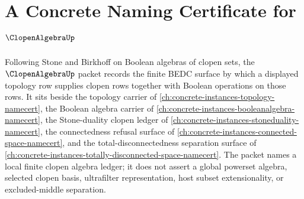 \chapter{A Concrete Naming Certificate for $\ClopenAlgebraUp$}
\label{ch:concrete-instances-clopen-algebra-namecert}

Following Stone and Birkhoff on Boolean algebras of clopen sets, the $\ClopenAlgebraUp$ packet records the finite BEDC surface by which a displayed topology row supplies clopen rows together with Boolean operations on those rows. It sits beside the topology carrier of \autoref{ch:concrete-instances-topology-namecert}, the Boolean algebra carrier of \autoref{ch:concrete-instances-booleanalgebra-namecert}, the Stone-duality clopen ledger of \autoref{ch:concrete-instances-stoneduality-namecert}, the connectedness refusal surface of \autoref{ch:concrete-instances-connected-space-namecert}, and the total-disconnectedness separation surface of \autoref{ch:concrete-instances-totally-disconnected-space-namecert}. The packet names a local finite clopen algebra ledger; it does not assert a global powerset algebra, selected clopen basis, ultrafilter representation, host subset extensionality, or excluded-middle separation.

